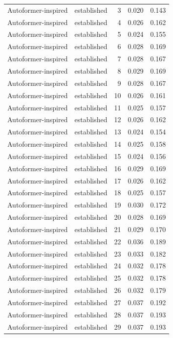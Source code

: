 \begin{tabular}{llrrr}
Autoformer-inspired & established & 3 & 0.020 & 0.143 \\
Autoformer-inspired & established & 4 & 0.026 & 0.162 \\
Autoformer-inspired & established & 5 & 0.024 & 0.155 \\
Autoformer-inspired & established & 6 & 0.028 & 0.169 \\
Autoformer-inspired & established & 7 & 0.028 & 0.167 \\
Autoformer-inspired & established & 8 & 0.029 & 0.169 \\
Autoformer-inspired & established & 9 & 0.028 & 0.167 \\
Autoformer-inspired & established & 10 & 0.026 & 0.161 \\
Autoformer-inspired & established & 11 & 0.025 & 0.157 \\
Autoformer-inspired & established & 12 & 0.026 & 0.162 \\
Autoformer-inspired & established & 13 & 0.024 & 0.154 \\
Autoformer-inspired & established & 14 & 0.025 & 0.158 \\
Autoformer-inspired & established & 15 & 0.024 & 0.156 \\
Autoformer-inspired & established & 16 & 0.029 & 0.169 \\
Autoformer-inspired & established & 17 & 0.026 & 0.162 \\
Autoformer-inspired & established & 18 & 0.025 & 0.157 \\
Autoformer-inspired & established & 19 & 0.030 & 0.172 \\
Autoformer-inspired & established & 20 & 0.028 & 0.169 \\
Autoformer-inspired & established & 21 & 0.029 & 0.170 \\
Autoformer-inspired & established & 22 & 0.036 & 0.189 \\
Autoformer-inspired & established & 23 & 0.033 & 0.182 \\
Autoformer-inspired & established & 24 & 0.032 & 0.178 \\
Autoformer-inspired & established & 25 & 0.032 & 0.178 \\
Autoformer-inspired & established & 26 & 0.032 & 0.179 \\
Autoformer-inspired & established & 27 & 0.037 & 0.192 \\
Autoformer-inspired & established & 28 & 0.037 & 0.193 \\
Autoformer-inspired & established & 29 & 0.037 & 0.193 \\

\end{tabular}
